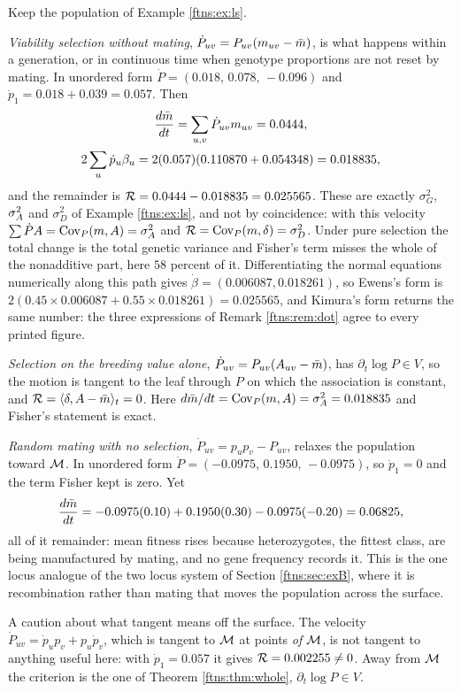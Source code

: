 \begin{example}
\label{ftns:ex:velocities}
Keep the population of Example \ref{ftns:ex:ls}.

\emph{Viability selection without mating}, $\dot P_{uv}=P_{uv}(m_{uv}-\bar{m})$, is what happens
within a generation, or in continuous time when genotype proportions are not reset by mating. In
unordered form $\dot P=(0.018,\,0.078,\,-0.096)$ and $\dot p_1=0.018+0.039=0.057$. Then
\begin{gather*}
\frac{d\bar{m}}{dt}=\sum_{u,v}\dot P_{uv}m_{uv}=0.0444,\\
2\sum_u\dot p_u\beta_u=2(0.057)(0.110870+0.054348)=0.018835,
\end{gather*}
and the remainder is $\mathcal{R}=0.0444-0.018835=0.025565$. These are exactly $\sigma^2_G$, $\sigma^{2}_{A}$ and
$\sigma^2_D$ of Example \ref{ftns:ex:ls}, and not by coincidence: with this velocity
$\sum\dot PA=\operatorname{Cov}_P(m,A)=\sigma^{2}_{A}$ and $\mathcal{R}=\operatorname{Cov}_P(m,\delta)=\sigma^2_D$. Under pure selection the total
change is the total genetic variance and Fisher's term misses the whole of the nonadditive part,
here $58$ percent of it. Differentiating the normal equations numerically along this path gives
$\dot\beta=(0.006087,0.018261)$, so Ewens's form is
$2(0.45\times0.006087+0.55\times0.018261)=0.025565$, and Kimura's form returns the same number:
the three expressions of Remark \ref{ftns:rem:dot} agree to every printed figure.

\emph{Selection on the breeding value alone}, $\dot P_{uv}=P_{uv}(A_{uv}-\bar{m})$, has
$\partial_t\log P\in V$, so the motion is tangent to the leaf through $P$ on which the association
is constant, and $\mathcal{R}=\langle\delta,A-\bar{m}\rangle_t=0$. Here $d\bar{m}/dt=\operatorname{Cov}_P(m,A)=\sigma^{2}_{A}=0.018835$ and
Fisher's statement is exact.

\emph{Random mating with no selection}, $\dot P_{uv}=p_up_v-P_{uv}$, relaxes the population toward
$\mathcal{M}$. In unordered form $\dot P=(-0.0975,\,0.1950,\,-0.0975)$, so $\dot p_1=0$ and the term Fisher
kept is zero. Yet
\[
\frac{d\bar{m}}{dt}=-0.0975(0.10)+0.1950(0.30)-0.0975(-0.20)=0.06825 ,
\]
all of it remainder: mean fitness rises because heterozygotes, the fittest class, are being
manufactured by mating, and no gene frequency records it. This is the one locus analogue of the
two locus system of Section \ref{ftns:sec:exB}, where it is recombination rather than mating that moves the population
across the surface.

A caution about what tangent means off the surface. The velocity
$\dot P_{uv}=\dot p_up_v+p_u\dot p_v$, which is tangent to $\mathcal{M}$ at points \emph{of} $\mathcal{M}$, is not
tangent to anything useful here: with $\dot p_1=0.057$ it gives $\mathcal{R}=0.002255\neq0$. Away from $\mathcal{M}$
the criterion is the one of Theorem \ref{ftns:thm:whole}, $\partial_t\log P\in V$.
\end{example}

